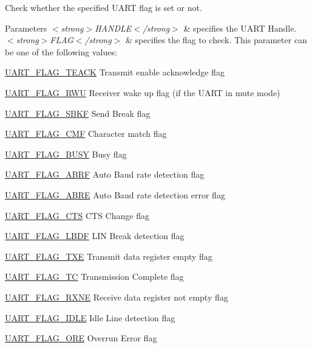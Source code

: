 Check whether the specified U\+A\+RT flag is set or not. 


\begin{DoxyParams}{Parameters}
{\em $<$strong$>$\+H\+A\+N\+D\+L\+E$<$/strong$>$} & specifies the U\+A\+RT Handle. \\
\hline
{\em $<$strong$>$\+F\+L\+A\+G$<$/strong$>$} & specifies the flag to check. This parameter can be one of the following values\+: \begin{DoxyItemize}
\item \mbox{\hyperlink{group___u_a_r_t___flags_gaf4a4ade6fd987ea7f22786269317f94a}{U\+A\+R\+T\+\_\+\+F\+L\+A\+G\+\_\+\+T\+E\+A\+CK}} Transmit enable acknowledge flag \item \mbox{\hyperlink{group___u_a_r_t___flags_ga5d5f6f91093bfb222baa277a86f6b75b}{U\+A\+R\+T\+\_\+\+F\+L\+A\+G\+\_\+\+R\+WU}} Receiver wake up flag (if the U\+A\+RT in mute mode) \item \mbox{\hyperlink{group___u_a_r_t___flags_gaea7a67e1f6a8af78e2adfaed59d1a4be}{U\+A\+R\+T\+\_\+\+F\+L\+A\+G\+\_\+\+S\+B\+KF}} Send Break flag \item \mbox{\hyperlink{group___u_a_r_t___flags_ga01f2c67d8999a9ee8d91ac3cb5e7fbfe}{U\+A\+R\+T\+\_\+\+F\+L\+A\+G\+\_\+\+C\+MF}} Character match flag \item \mbox{\hyperlink{group___u_a_r_t___flags_ga2d1387d412382a345097acb403748ba3}{U\+A\+R\+T\+\_\+\+F\+L\+A\+G\+\_\+\+B\+U\+SY}} Busy flag \item \mbox{\hyperlink{group___u_a_r_t___flags_ga9e309874f2c8f71e4049ae6cb702a2eb}{U\+A\+R\+T\+\_\+\+F\+L\+A\+G\+\_\+\+A\+B\+RF}} Auto Baud rate detection flag \item \mbox{\hyperlink{group___u_a_r_t___flags_ga87853efaab808377c8acb9e8b671a2e8}{U\+A\+R\+T\+\_\+\+F\+L\+A\+G\+\_\+\+A\+B\+RE}} Auto Baud rate detection error flag \item \mbox{\hyperlink{group___u_a_r_t___flags_ga5435edd22ff23de7187654362c48e0b1}{U\+A\+R\+T\+\_\+\+F\+L\+A\+G\+\_\+\+C\+TS}} C\+TS Change flag \item \mbox{\hyperlink{group___u_a_r_t___flags_ga77b81c3c843b49af940862fe4d6ab933}{U\+A\+R\+T\+\_\+\+F\+L\+A\+G\+\_\+\+L\+B\+DF}} L\+IN Break detection flag \item \mbox{\hyperlink{group___u_a_r_t___flags_gad39c017d415a7774c82eb07413a9dbe4}{U\+A\+R\+T\+\_\+\+F\+L\+A\+G\+\_\+\+T\+XE}} Transmit data register empty flag \item \mbox{\hyperlink{group___u_a_r_t___flags_ga82e68a0ee4a8b987a47c66fc6f744894}{U\+A\+R\+T\+\_\+\+F\+L\+A\+G\+\_\+\+TC}} Transmission Complete flag \item \mbox{\hyperlink{group___u_a_r_t___flags_ga9d1b2860d84a87abb05c3b2fed3c108c}{U\+A\+R\+T\+\_\+\+F\+L\+A\+G\+\_\+\+R\+X\+NE}} Receive data register not empty flag \item \mbox{\hyperlink{group___u_a_r_t___flags_ga5d7a320c505672f7508e3bd99f532a69}{U\+A\+R\+T\+\_\+\+F\+L\+A\+G\+\_\+\+I\+D\+LE}} Idle Line detection flag \item \mbox{\hyperlink{group___u_a_r_t___flags_ga335a5b0f61512223bbc406b38c95b2d6}{U\+A\+R\+T\+\_\+\+F\+L\+A\+G\+\_\+\+O\+RE}} Overrun Error flag \item 
\end{DoxyItemize}
\end{DoxyParams}
